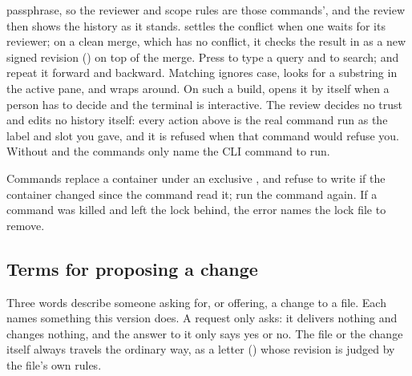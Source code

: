 passphrase, so the reviewer and scope rules are those commands', and the review
then shows the history as it stands.  settles the conflict when one waits for its reviewer; on a clean merge, which has no conflict, it checks the result in as a new signed revision () on top of the merge. Press \code{/} to type a query and  to search;  and
 repeat it forward and backward. Matching ignores case, looks for a
substring in the active pane, and wraps around. On such a build,
 opens it by itself when a person
has to decide and the terminal is interactive. The review decides no trust
and edits no history itself: every action above is the real command run
as the label and slot you gave, and it is refused when that command would
refuse you. Without  and  the commands only name the
CLI command to run.

\begin{cautionBox}
Commands replace a container under an exclusive , and
refuse to write if the container changed since the command read it; run the
command again. If a command was killed and left the lock behind, the error
names the lock file to remove.
\end{cautionBox}

\subsection{Terms for proposing a change}

Three words describe someone asking for, or offering, a change to a file.
Each names something this version does. A request only asks: it delivers
nothing and changes nothing, and the answer to it only says yes or no. The
file or the change itself always travels the ordinary way, as a letter
() whose revision is judged by the file's own rules.

